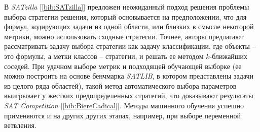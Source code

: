 В \textit{SATzilla} [\ref{bib:SATzilla}] предложен неожиданный подход решения проблемы выбора стратегии решения, который основывается на предположении, что для формул, кодирующих задачи из одной области, или близких в смысле некоторой метрики, можно использовать сходные стратегии. Точнее, авторы предлагают рассматривать задачу выбора стратегии как задачу классификации, где объекты – это формулы, а метки классов – стратегии, и решать ее методом $k$-ближайших соседей. При удачном выборе метрик и подходящей обучающей выборке (ее можно построить на основе бенчмарка \textit{SATLIB}, в котором представлены задачи из целого ряда областей), такой метод автоматического выбора параметров выигрывает у жестких предопределенных стратегий, что доказывают результаты \textit{SAT Competition} [\ref{bib:BiereCadical}]. 
Методы машинного обучения успешно применяются и на других других этапах, например, при выборе переменной ветвления.

